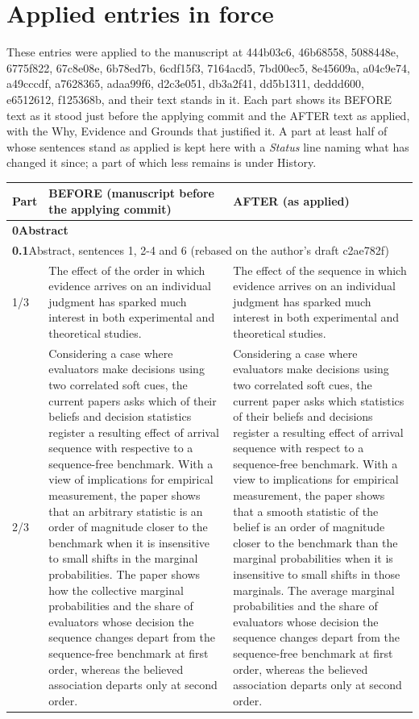 \documentclass[10pt]{article}
\theoremstyle{definition}
\newcommand{\entryhead}[2]{\multicolumn{3}{|l|}{\rule{0pt}{2.6ex}\large\textbf{#1}\quad #2} \\ \hline}
\begin{document}
\section*{Applied entries in force}
These entries were applied to the manuscript at 444b03c6, 46b68558, 5088448e, 6775f822, 67c8e08e, 6b78ed7b, 6cdf15f3, 7164acd5, 7bd00ec5, 8e45609a, a04c9e74, a49cccdf, a7628365, adaa99f6, d2c3e051, db3a2f41, dd5b1311, deddd600, e6512612, f125368b, and their text stands in
it. Each part shows its BEFORE text as it stood just before the applying commit and the AFTER text as
applied, with the Why, Evidence and Grounds that justified it. A part at least half of whose sentences
stand as applied is kept here with a \textit{Status} line naming what has changed it since; a part of
which less remains is under History.
{\small
\begin{longtable}{|p{0.9cm}|p{12.2cm}|p{12.2cm}|}
\hline
\textbf{Part} & \textbf{BEFORE (manuscript before the applying commit)} & \textbf{AFTER (as applied)} \\ \hline\hline
\endhead
\multicolumn{3}{|l|}{\rule{0pt}{3.2ex}\Large\textbf{0\quad Abstract}} \\ \hline\hline
\entryhead{0.1}{Abstract, sentences 1, 2-4 and 6 (rebased on the author's draft c2ae782f)\quad{\footnotesize\textit{(formerly C.1)}}}
1/3 & The effect of the order in which evidence arrives on an individual judgment has sparked much interest in both experimental and theoretical studies. & The effect of the sequence in which evidence arrives on an individual judgment has sparked much interest in both experimental and theoretical studies. \\ \hline
2/3 & Considering a case where evaluators make decisions using two correlated soft cues, the current papers asks which of their beliefs and decision statistics register a resulting effect of arrival sequence with respective to a sequence-free benchmark. With a view of implications for empirical measurement, the paper shows that an arbitrary statistic is an order of magnitude closer to the benchmark when it is insensitive to small shifts in the marginal probabilities. The paper shows how the collective marginal probabilities and the share of evaluators whose decision the sequence changes depart from the sequence-free benchmark at first order, whereas the believed association departs only at second order. & Considering a case where evaluators make decisions using two correlated soft cues, the current paper asks which statistics of their beliefs and decisions register a resulting effect of arrival sequence with respect to a sequence-free benchmark. With a view to implications for empirical measurement, the paper shows that a smooth statistic of the belief is an order of magnitude closer to the benchmark than the marginal probabilities when it is insensitive to small shifts in those marginals. The average marginal probabilities and the share of evaluators whose decision the sequence changes depart from the sequence-free benchmark at first order, whereas the believed association departs only at second order. \\ \hline

\end{longtable}}
\end{document}
